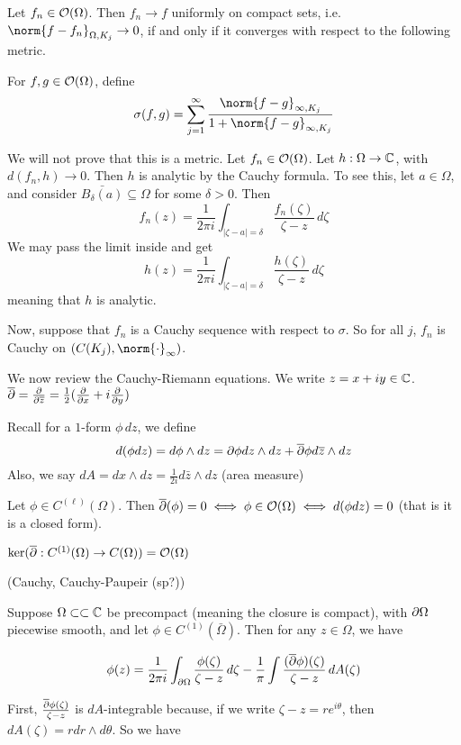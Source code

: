 \documentclass[x11names,reqno,14pt]{extarticle}
\begin{document}
\lem Let $f_n \in \mathcal{O}(\Omega)$. Then $f_n \to f$ uniformly on compact sets, i.e. $\norm{f - f_n}_{\Omega, K_j}\to0$, if and only if it converges with respect to the following metric. 

 For $f, g \in \mathcal{O}(\Omega)$, define
\[
\sigma(f, g) = \sum_{j=1}^{\oo} \frac{\norm{f - g}_{\oo, K_j}}{1 + \norm{f - g}_{\oo, K_j}}
\]

\proof

We will not prove that this is a metric. Let $f_n \in \mathcal{O}(\Omega)$. Let $h:\Omega\to \mathbb{C}$, with $d(f_n, h) \to 0$. Then $h$ is analytic by the Cauchy formula. To see this, let $a\in\Omega$, and consider $\bar{B_\delta(a)}\subseteq\Omega$ for some $\delta>0$. Then 
\[
f_n(z) = \frac{1}{2\pi i}\int_{|\zeta - a| = \delta}\frac{f_n(\zeta)}{\zeta - z}\,d\zeta
\]
We may pass the limit inside and get 
\[
h(z) = \frac{1}{2\pi i}\int_{|\zeta - a| = \delta}\frac{h(\zeta)}{\zeta - z}\,d\zeta
\]
meaning that $h$ is analytic. 

Now, suppose that $f_n$ is a Cauchy sequence with respect to $\sigma$. So for all $j$, $f_n$ is Cauchy on $(C(K_j), \norm{\cdot}_{\oo})$. 

We now review the Cauchy-Riemann equations. We write $z = x + iy\in\mathbb{C}$. $\overline{\partial} = \frac{\partial}{\partial\overline{z}} = \frac{1}{2}(\frac{\partial}{\partial x} + i\frac{\partial}{\partial y})$

Recall for a $1$-form $\phi\,dz$, we define
\[
d(\phi dz) = d\phi\wedge dz = \partial\phi dz \wedge dz + \overline{\partial}\phi d\overline{z}\wedge dz
\]
Also, we say $dA = dx \wedge dz = \frac{1}{2i}d\bar{z}\wedge dz$ (area measure)

\thm Let $\phi \in C^{(\ell)}(\Omega)$. Then $\overline{\partial}(\phi) = 0 \iff \phi \in \mathcal{O}(\Omega) \iff d(\phi dz) = 0$ (that is it is a closed form).  

\cor $\ker(\overline{\partial}:C^{(1)}(\Omega)\to C(\Omega)) = \mathcal{O}(\Omega)$

\thm (Cauchy, Cauchy-Paupeir (sp?))

Suppose $\Omega\subset\subset \mathbb{C}$ be precompact (meaning the closure is compact), with $\partial\Omega$ piecewise smooth, and let $\phi\in C^{(1)}(\bar{\Omega})$. Then for any $z \in \Omega$, we have

\[
\phi(z) = \frac{1}{2\pi i}\int_{\partial\Omega}\frac{\phi(\zeta)}{\zeta - z}\,d\zeta - \frac{1}{\pi}\int\frac{(\overline{\partial}\phi)(\zeta)}{\zeta - z}\,dA(\zeta)
\]

\proof

First, $\frac{\overline{\partial}\phi(\zeta)}{\zeta - z}$ is $dA$-integrable because, if we write $\zeta - z = re^{i\theta}$, then $dA(\zeta) = rdr\wedge d\theta$. So we have
\end{document}

